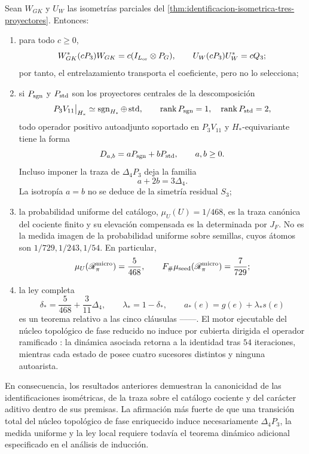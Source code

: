 \begin{theorem}
\label{p3-20260826:thm:alcance-induccion-accion}
Sean \(W_{GK}\) y \(U_W\) las isometrías parciales del
\cref{thm:identificacion-isometrica-tres-proyectores}. Entonces:
\begin{enumerate}
  \item para todo \(c\geq0\),
  \[
   W_{GK}^{*}(cP_3)W_{GK}
   =c(I_{L_{\rm or}}\otimes P_G),
   \qquad
   U_W(cP_3)U_W^{*}=cQ_3;
  \]
  por tanto, el entrelazamiento transporta el coeficiente, pero no lo
  selecciona;
  \item si \(P_{\rm sgn}\) y \(P_{\rm std}\) son los proyectores centrales
  de la descomposición
  \[
   P_3V_{11}\big|_{H_*}
   \simeq \operatorname{sgn}_{H_*}\oplus\operatorname{std},
   \qquad
   \operatorname{rank}P_{\rm sgn}=1,
   \quad
   \operatorname{rank}P_{\rm std}=2,
  \]
  todo operador positivo autoadjunto soportado en \(P_3V_{11}\) y
  \(H_*\)-equivariante tiene la forma
  \[
   D_{a,b}=aP_{\rm sgn}+bP_{\rm std},
   \qquad a,b\geq0.
  \]
  Incluso imponer la traza de \(\Delta_4P_3\) deja la familia
  \[
   a+2b=3\Delta_4.
  \]
  La isotropía \(a=b\) no se deduce de la simetría residual \(S_3\);
  \item la probabilidad uniforme del catálogo,
  \(\mu_U(U)=1/468\), es la traza canónica del cociente finito y su
  elevación compensada es la determinada por \(J_F\). No es la
  medida imagen de la probabilidad uniforme sobre semillas, cuyos átomos son
  \(1/729,1/243,1/54\). En particular,
  \[
   \mu_U(\mathscr R_\pi^{\rm micro})=\frac5{468},
   \qquad
   F_\#\mu_{\rm seed}(\mathscr R_\pi^{\rm micro})=\frac7{729};
  \]
  \item la ley completa
  \[
   \delta_*=\frac5{468}+\frac3{11}\Delta_4,
   \qquad
   \lambda_*=1-\delta_*,
   \qquad
   a_*(e)=g(e)+\lambda_*s(e)
  \]
  es un teorema relativo a las cinco cláusulas \HTr--\HAdd--\HDef--\HRes--\HLoc. El motor
  ejecutable del núcleo topológico de fase reducido no induce por cubierta dirigida el operador ramificado
  \Gtr: la dinámica asociada retorna a la identidad tras \(54\) iteraciones,
  mientras cada estado de
  \Gtr posee cuatro sucesores distintos y ninguna autoarista.
\end{enumerate}
En consecuencia, los resultados anteriores demuestran la canonicidad de las identificaciones
isométricas, de la traza sobre el catálogo cociente y del carácter aditivo
dentro de sus premisas. La afirmación más fuerte de que una transición total
del núcleo topológico de fase enriquecido induce necesariamente \(\Delta_4P_3\), la medida uniforme y la
ley local requiere todavía el teorema dinámico adicional especificado en el
análisis de inducción.
\end{theorem}

